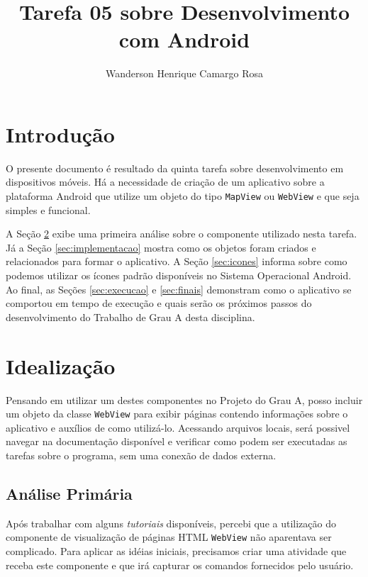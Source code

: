 \documentclass{article}
\title{Tarefa 05 sobre Desenvolvimento com Android}
\author{Wanderson Henrique Camargo Rosa\inst{1}}
\begin{document}
\maketitle{}

\section{Introdução}
\label{sec:introducao}

O presente documento é resultado da quinta tarefa sobre desenvolvimento em
dispositivos móveis. Há a necessidade de criação de um aplicativo sobre a
plataforma Android que utilize um objeto do tipo \texttt{MapView} ou
\texttt{WebView} e que seja simples e funcional.

A Seção \ref{sec:idealizacao} exibe uma primeira análise sobre o componente
utilizado nesta tarefa. Já a Seção \ref{sec:implementacao} mostra como os
objetos foram criados e relacionados para formar o aplicativo. A Seção
\ref{sec:icones} informa sobre como podemos utilizar os ícones padrão
disponíveis no Sistema Operacional Android. Ao final, as Seções
\ref{sec:execucao} e \ref{sec:finais} demonstram como o aplicativo se comportou
em tempo de execução e quais serão os próximos passos do desenvolvimento do
Trabalho de Grau A desta disciplina.

\section{Idealização}
\label{sec:idealizacao}

Pensando em utilizar um destes componentes no Projeto do Grau A, posso incluir
um objeto da classe \texttt{WebView} para exibir páginas contendo informações
sobre o aplicativo e auxílios de como utilizá-lo. Acessando arquivos locais,
será possivel navegar na documentação disponível e verificar como podem ser
executadas as tarefas sobre o programa, sem uma conexão de dados externa.

\subsection{Análise Primária}

Após trabalhar com alguns \emph{tutoriais} disponíveis, percebi que a utilização
do componente de visualização de páginas HTML \texttt{WebView} não aparentava
ser complicado. Para aplicar as idéias iniciais, precisamos criar uma atividade
que receba este componente e que irá capturar os comandos fornecidos pelo
usuário.
\end{document}
